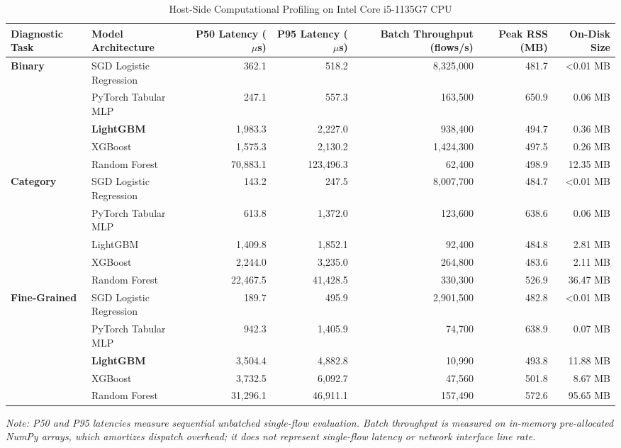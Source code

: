 \documentclass[conference,10pt,twocolumn]{IEEEtran}
\begin{document}
\begin{table}[t]
\centering
\caption{Host-Side Computational Profiling on Intel Core i5-1135G7 CPU}
\label{tab:computational_profiling}
\small
\begin{tabular}{@{}llrrrrr@{}}
\toprule
\textbf{Diagnostic Task} & \textbf{Model Architecture} & \textbf{P50 Latency ($\mu$s)} & \textbf{P95 Latency ($\mu$s)} & \textbf{Batch Throughput (flows/s)} & \textbf{Peak RSS (MB)} & \textbf{On-Disk Size} \\ \midrule
\multirow{5}{*}{\textbf{Binary}} 
& SGD Logistic Regression & 362.1 & 518.2 & 8,325,000 & 481.7 & <0.01 MB \\
& PyTorch Tabular MLP & 247.1 & 557.3 & 163,500 & 650.9 & 0.06 MB \\
& \textbf{LightGBM} & 1,983.3 & 2,227.0 & 938,400 & 494.7 & 0.36 MB \\
& XGBoost & 1,575.3 & 2,130.2 & 1,424,300 & 497.5 & 0.26 MB \\
& Random Forest & 70,883.1 & 123,496.3 & 62,400 & 498.9 & 12.35 MB \\ \midrule
\multirow{5}{*}{\textbf{Category}} 
& SGD Logistic Regression & 143.2 & 247.5 & 8,007,700 & 484.7 & <0.01 MB \\
& PyTorch Tabular MLP & 613.8 & 1,372.0 & 123,600 & 638.6 & 0.06 MB \\
& LightGBM & 1,409.8 & 1,852.1 & 92,400 & 484.8 & 2.81 MB \\
& XGBoost & 2,244.0 & 3,235.0 & 264,800 & 483.6 & 2.11 MB \\
& Random Forest & 22,467.5 & 41,428.5 & 330,300 & 526.9 & 36.47 MB \\ \midrule
\multirow{5}{*}{\textbf{Fine-Grained}} 
& SGD Logistic Regression & 189.7 & 495.9 & 2,901,500 & 482.8 & <0.01 MB \\
& PyTorch Tabular MLP & 942.3 & 1,405.9 & 74,700 & 638.9 & 0.07 MB \\
& \textbf{LightGBM} & 3,504.4 & 4,882.8 & 10,990 & 493.8 & 11.88 MB \\
& XGBoost & 3,732.5 & 6,092.7 & 47,560 & 501.8 & 8.67 MB \\
& Random Forest & 31,296.1 & 46,911.1 & 157,490 & 572.6 & 95.65 MB \\ \bottomrule
\end{tabular}
\par\vspace{3pt}
\footnotesize\textit{Note: P50 and P95 latencies measure sequential unbatched single-flow evaluation. Batch throughput is measured on in-memory pre-allocated NumPy arrays, which amortizes dispatch overhead; it does not represent single-flow latency or network interface line rate.}
\end{table}
\end{document}
